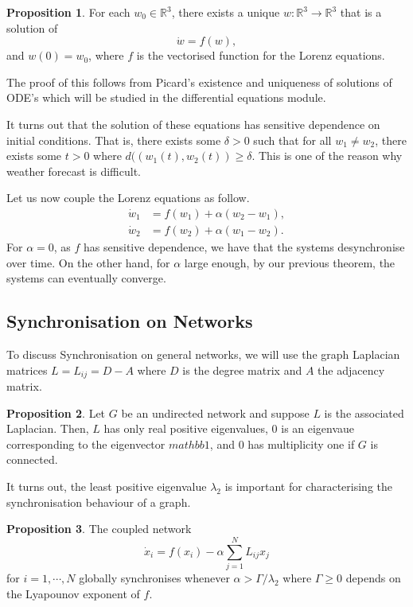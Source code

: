 \documentclass[
]{article}
\theoremstyle{definition}
\newtheorem{prop}{Proposition}[theorem]
\theoremstyle{definition}
\begin{document}
\begin{prop}
  For each \(w_0 \in \mathbb{R}^3\), there exists a unique 
  \(w : \mathbb{R}^3 \to \mathbb{R}^3\) that is a solution of 
  \[\dot w = f(w),\]
  and \(w(0) = w_0\), where \(f\) is the vectorised function for the Lorenz 
  equations.
\end{prop}

The proof of this follows from Picard's existence and uniqueness of
solutions of ODE's which will be studied in the differential equations
module.

It turns out that the solution of these equations has sensitive
dependence on initial conditions. That is, there exists some
\(\delta > 0\) such that for all \(w_1 \neq w_2\), there exists some
\(t > 0\) where \(d((w_1(t), w_2(t)) \ge \delta\). This is one of the
reason why weather forecast is difficult.

Let us now couple the Lorenz equations as follow. \begin{align*}
  \dot w_1 & = f(w_1) + \alpha(w_2 - w_1),\\
  \dot w_2 & = f(w_2) + \alpha(w_1 - w_2).
\end{align*} For \(\alpha = 0\), as \(f\) has sensitive dependence, we
have that the systems desynchronise over time. On the other hand, for
\(\alpha\) large enough, by our previous theorem, the systems can
eventually converge.

\hypertarget{synchronisation-on-networks}{%
\subsection{Synchronisation on
Networks}\label{synchronisation-on-networks}}

To discuss Synchronisation on general networks, we will use the graph
Laplacian matrices \(L = L_{ij} = D - A\) where \(D\) is the degree
matrix and \(A\) the adjacency matrix.

\begin{prop}
  Let \(G\) be an undirected network and suppose \(L\) is the associated Laplacian.
  Then, \(L\) has only real positive eigenvalues, \(0\) is an eigenvaue corresponding 
  to the eigenvector \(mathbb{1}\), and \(0\) has multiplicity one if \(G\) is 
  connected.
\end{prop}

It turns out, the least positive eigenvalue \(\lambda_2\) is important
for characterising the synchronisation behaviour of a graph.

\begin{prop}
  The coupled network 
  \[\dot x_i = f(x_i) - \alpha \sum_{j = 1}^N L_{ij}x_j\]
  for \(i = 1, \cdots, N\) globally synchronises whenever 
  \(\alpha > \Gamma / \lambda_2\) where \(\Gamma \ge 0\) depends on the 
  Lyapounov exponent of \(f\). 
\end{prop}
\end{document}
